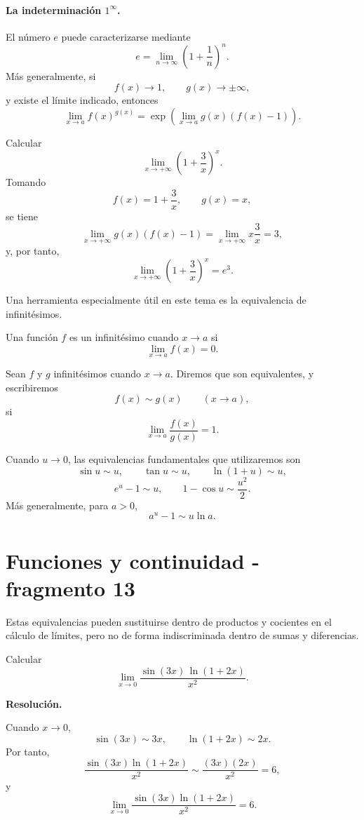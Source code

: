 \paragraph{La indeterminación $1^\infty$.}
El número $e$ puede caracterizarse mediante
\[
e=\lim_{n\to\infty}\left(1+\frac1n\right)^n.
\]
Más generalmente, si
\[
f(x)\to1,
\qquad
g(x)\to\pm\infty,
\]
y existe el límite indicado, entonces
\[
\lim_{x\to a}f(x)^{g(x)}
=
\exp\left(\lim_{x\to a}g(x)(f(x)-1)\right).
\]

\begin{example}
Calcular
\[
\lim_{x\to+\infty}\left(1+\frac{3}{x}\right)^x.
\]
Tomando
\[
f(x)=1+\frac3x,
\qquad g(x)=x,
\]
se tiene
\[
\lim_{x\to+\infty}g(x)(f(x)-1)
=\lim_{x\to+\infty}x\frac3x=3,
\]
y, por tanto,
\[
\lim_{x\to+\infty}\left(1+\frac3x\right)^x=e^3.
\]
\end{example}

Una herramienta especialmente útil en este tema es la equivalencia de infinitésimos.

\begin{definition}[Infinitésimo]
Una función $f$ es un infinitésimo cuando $x\to a$ si
\[
\lim_{x\to a}f(x)=0.
\]
\end{definition}

\begin{definition}
Sean $f$ y $g$ infinitésimos cuando $x\to a$. Diremos que son equivalentes, y escribiremos
\[
f(x)\sim g(x)\qquad(x\to a),
\]
si
\[
\lim_{x\to a}\frac{f(x)}{g(x)}=1.
\]
\end{definition}

Cuando $u\to0$, las equivalencias fundamentales que utilizaremos son
\[
\sin u\sim u,
\qquad
\tan u\sim u,
\qquad
\ln(1+u)\sim u,
\]
\[
e^u-1\sim u,
\qquad
1-\cos u\sim\frac{u^2}{2}.
\]
Más generalmente, para $a>0$,
\[
a^u-1\sim u\ln a.
\]


\section{Funciones y continuidad - fragmento 13}
Estas equivalencias pueden sustituirse dentro de productos y cocientes en el cálculo de límites, pero no de forma indiscriminada dentro de sumas y diferencias.

\begin{solvedexercise}
Calcular
\[
\lim_{x\to0}\frac{\sin(3x)\,\ln(1+2x)}{x^2}.
\]

\textbf{Resolución.}\par\smallskip
Cuando $x\to0$,
\[
\sin(3x)\sim3x,
\qquad
\ln(1+2x)\sim2x.
\]
Por tanto,
\[
\frac{\sin(3x)\ln(1+2x)}{x^2}
\sim
\frac{(3x)(2x)}{x^2}=6,
\]
y
\[
\boxed{\displaystyle
\lim_{x\to0}\frac{\sin(3x)\ln(1+2x)}{x^2}=6.}
\]
\end{solvedexercise}

